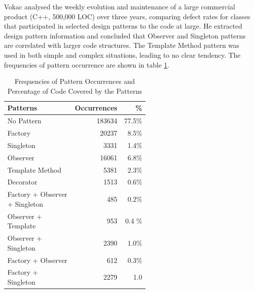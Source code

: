 \documentclass[sigplan,12pt,nonacm=true,review=false]{acmart}
\begin{document}
Vokac \cite{vokac_defect_2004} analysed the weekly evolution and maintenance of a large commercial product (C++, 500,000 LOC) over three years, comparing defect rates for classes that participated in selected design patterns to the code at large. He extracted design pattern information and concluded that Observer and Singleton patterns are correlated with larger code structures. The Template Method pattern was used in both simple and complex situations, leading to no clear tendency. The frequencies of pattern occurrence are shown in table \ref{tab:stats2}.
\footnotesize
\begin{table}[]
    \centering
    \begin{tabularx}{\linewidth}{p{0.57\linewidth}|r|r|}
         Patterns&Occurrences&\%  \\ \hline
         No Pattern&183634&77.5\% \\ \hline
         Factory&20237&8.5\% \\
         Singleton&3331&1.4\% \\
         Observer&16061&6.8\% \\ 
         Template Method&5381&2.3\% \\
         Decorator&1513&0.6\% \\ \hline
         
         Factory + Observer + Singleton&485&0.2\% \\
         Observer + Template&953&0.4 \% \\
         Observer + Singleton&2390&1.0\% \\
         Factory + Observer&612&0.3\% \\
         Factory + Singleton&2279&1.0%
         
    \end{tabularx}
    \caption{Frequencies of Pattern Occurrences and Percentage of Code Covered by the Patterns}
    \label{tab:stats2}
\end{table}
\end{document}
